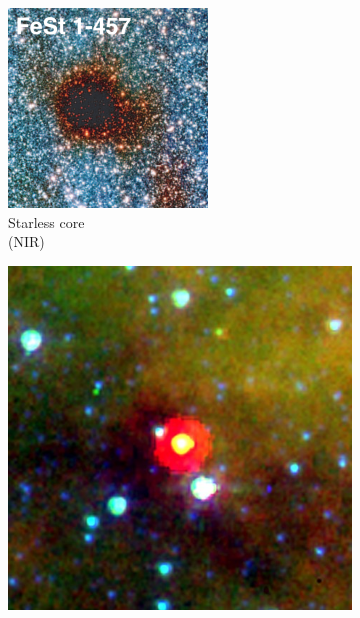 \begin{figure}
    \centering
    \begin{subfigure}[b]{0.19\textwidth}
        \includegraphics[width=\textwidth]{Figures/0_proto_1.jpg}
        \caption{  Starless core\\\centering (NIR)}
        \label{Fig:0_proto_1}
    \end{subfigure}
    \begin{subfigure}[b]{0.19\textwidth}
        \includegraphics[width=\textwidth]{Figures/0_proto_2.jpg}

\end{subfigure}
\end{figure}

